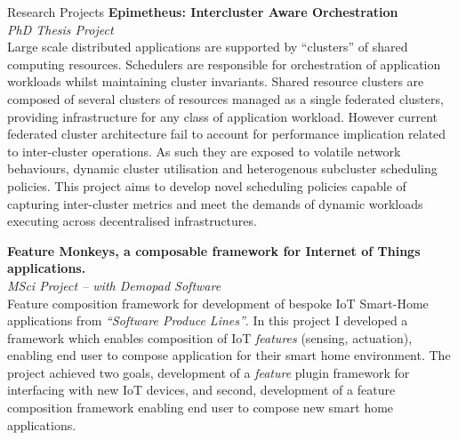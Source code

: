 \documentclass{resume} %
\begin{document}
\begin{rSection}{Research Projects}
{\bf Epimetheus: Intercluster Aware Orchestration}\\
{\textit{PhD Thesis Project}}\\
Large scale distributed applications are supported by  ``clusters'' of shared computing resources. Schedulers are responsible for orchestration of application workloads whilst maintaining cluster invariants. Shared resource clusters are composed of several clusters of resources managed as a single federated clusters, providing infrastructure for any class of application workload. However current federated cluster architecture fail to account for performance implication related to inter-cluster operations. As such they are exposed to volatile network behaviours, dynamic cluster utilisation and heterogenous subcluster scheduling policies. This project aims to develop novel scheduling policies capable of capturing inter-cluster metrics and meet the demands of dynamic workloads executing across decentralised infrastructures.

{\bf Feature Monkeys, a composable framework for Internet of Things applications.}\\
{\textit {MSci Project -- with Demopad Software}}\\
Feature composition framework for development of bespoke IoT Smart-Home applications from \textit{``Software Produce Lines''}. In this project I developed a framework which enables composition of IoT \textit{features} (sensing, actuation), enabling end user to compose application for their smart home environment. The project achieved two goals, development of a \textit{feature} plugin framework for interfacing with new IoT devices, and second, development of a feature composition framework enabling end user to compose  new smart home applications.
\end{rSection}
\end{document}
